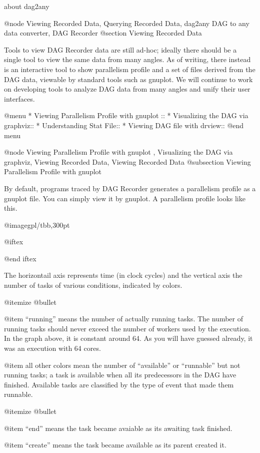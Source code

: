 about dag2any

@node Viewing Recorded Data, Querying Recorded Data, dag2any DAG to any data converter, DAG Recorder
@section Viewing Recorded Data

Tools to view DAG Recorder data are still ad-hoc; ideally there should
be a single tool to view the same data from many angles.  As of writing,
there instead is an interactive tool to show parallelism profile and a
set of files derived from the DAG data, viewable by standard tools such as
gnuplot.  We will continue to work on developing tools to analyze DAG
data from many angles and unify their user interfaces.

@menu
* Viewing Parallelism Profile with gnuplot ::
* Visualizing the DAG via graphviz::
* Understanding Stat File::
* Viewing DAG file with drview::
@end menu

@node Viewing Parallelism Profile with gnuplot , Visualizing the DAG via graphviz, Viewing Recorded Data, Viewing Recorded Data
@subsection Viewing Parallelism Profile with gnuplot 

By default, programs traced by DAG Recorder generates a parallelism profile as a gnuplot file.  You can simply view it by gnuplot.  A parallelism profile looks like this.

@image{gpl/tbb,300pt}

@iftex


@end iftex

The horizontail axis represents time (in clock cycles) and the vertical
axis the number of tasks of various conditions, indicated by colors.

@itemize @bullet

@item ``running'' means the number of actually running tasks.
The number of running tasks should never exceed the number of workers used
by the execution.  In the graph above, it is constant around 64.  As you
will have guessed already, it was an execution with 64 cores.

@item all other colors mean the number of ``available'' or 
``runnable'' but not running tasks; a task is available when all its
predecessors in the DAG have finished.  Available tasks are classified
by the type of event that made them runnable.  

@itemize @bullet

@item ``end'' means the task became avaiable as its awaiting task finished.

@item ``create'' means the task became available as its parent created it.


